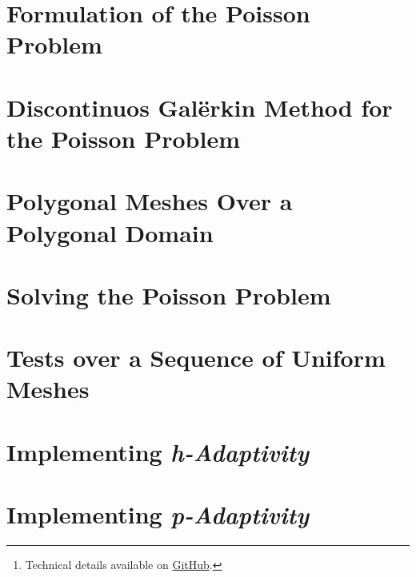 \documentclass[12pt, twoside]{article}
\title{\reporttitle}
\author{Andrea Di Antonio, 10655477} %
\date{Exam session of July, 2024 \\ Academic Year 2023-24}
\begin{document}
	\maketitle
	\thispagestyle{fancy}

	\begin{abstract}
		\begin{center}
			Report for the course \textit{Advanced Programming for Scientific Computing} on the implementation details\footnote{Technical details available on \hyperlink{https://github.com/diantonioandrea/pacs-project}{GitHub}.} of an \textit{hp-adaptive} discontinuous Galërkin algorithm.
		\end{center}
	\end{abstract}

	\newpage
	\tableofcontents

	\newpage
    \section{Formulation of the Poisson Problem}
	

	\newpage
    \section{Discontinuos Galërkin Method for the Poisson Problem}
	

	\newpage
    \section{Polygonal Meshes Over a Polygonal Domain}
	

	\newpage
    \section{Solving the Poisson Problem}
	

	\newpage
    \section{Tests over a Sequence of Uniform Meshes}
	

	\newpage
    \section{Implementing \textit{h-Adaptivity}}
	

	\newpage
    \section{Implementing \textit{p-Adaptivity}}
	


	\newpage
	
	
\end{document}
